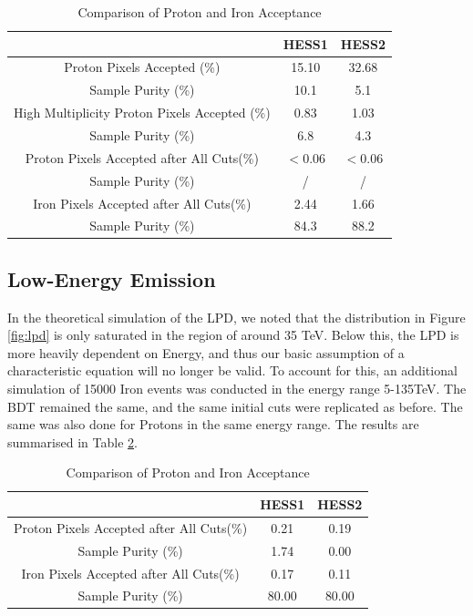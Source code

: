 \documentclass[11pt]{article}
\begin{document}
\begin{table}[h!]
  \centering
  \caption{Comparison of Proton and Iron Acceptance}
  \label{tab:protonacceptance}
  \begin{tabular}{ccc}
    \toprule
    & HESS1  & HESS2 \\
    \midrule
    Proton Pixels Accepted (\%) & 15.10 & 32.68\\
    Sample Purity (\%) & 10.1 & 5.1 \\
    \midrule
    High Multiplicity Proton Pixels Accepted (\%) & 0.83 & 1.03\\
    Sample Purity (\%) & 6.8 & 4.3 \\
    \midrule
    Proton Pixels Accepted after All Cuts(\%) & $< 0.06$ & $< 0.06$\\
    Sample Purity (\%) & / & / \\
    \midrule
    Iron Pixels Accepted after All Cuts(\%) & 2.44 & 1.66\\
    Sample Purity (\%) & 84.3 & 88.2 \\
    \bottomrule
  \end{tabular}
\end{table}

\subsection{Low-Energy Emission}
In the theoretical simulation of the LPD, we noted that the distribution in Figure \ref{fig:lpd} is only saturated in the region of around 35 TeV. Below this, the LPD is more heavily dependent on Energy, and thus our basic assumption of a characteristic equation will no longer be valid. To account for this, an additional simulation of 15000 Iron events was conducted in the energy range 5-135TeV. The BDT remained the same, and the same initial cuts were replicated as before. The same was also done for Protons in the same energy range. The results are summarised in Table \ref{tab:fullironacceptance}. 

\begin{table}[h!]
  \centering
  \caption{Comparison of Proton and Iron Acceptance}
  \label{tab:fullironacceptance}
  \begin{tabular}{ccc}
    \toprule
    & HESS1  & HESS2 \\
    \midrule
    Proton Pixels Accepted after All Cuts(\%) & 0.21 & 0.19\\
    Sample Purity (\%) & 1.74 & 0.00 \\
    \midrule
    Iron Pixels Accepted after All Cuts(\%) & 0.17 & 0.11\\
    Sample Purity (\%) & 80.00 & 80.00 \\
    \bottomrule
  \end{tabular}
\end{table}
\end{document}
